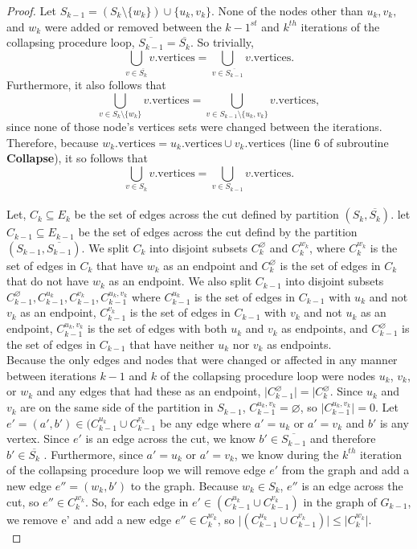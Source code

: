 \documentclass[psamsfonts, 10pt]{amsart}
\theoremstyle{definition}
\theoremstyle{remark}
\numberwithin{equation}{section}
\newcommand{\tor}{\text{ or } }
\newcommand{\creturn}{\mbox{}\\}
\begin{document}
\begin{proof}
Let $S_{k-1} = (S_k \setminus \{w_k\}) \cup \{u_k, v_k\}$. None of the nodes other than $u_k,v_k,$ and $w_k$ were added or removed between the $k-1^{st}$ and $k^{th}$ iterations of the collapsing procedure loop, $\overline{S_{k-1}} = \overline{S_k}$. So trivially, 
\[
\bigcup_{v \in \overline{S_k}} v.\text{vertices} = \bigcup_{v \in \overline{S_{k-1}}} v.\text{vertices}.
\]
Furthermore, it also follows that
\[
\bigcup_{v \in S_k \setminus \{w_k\}} v.\text{vertices} = \bigcup_{v \in S_{k-1} \setminus \{u_k, v_k\}} v.\text{vertices},
\]
since none of those node's vertices sets were changed between the iterations. Therefore, because $w_k.\text{vertices} = u_k.\text{vertices} \cup v_k.\text{vertices}$ (line 6 of subroutine {\bf Collapse}), it so follows that
\[
\bigcup_{v \in S_k} v.\text{vertices} = \bigcup_{v \in S_{k-1}} v.\text{vertices}.
\]
\creturn
Let, $C_k \subseteq E_k$ be the set of edges across the cut defined by partition $(S_k, \overline{S_k})$. let $C_{k-1} \subseteq E_{k-1}$ be the set of edges across the cut defind by the partition $(S_{k-1}, \overline{S_{k-1}})$. We split $C_{k}$ into disjoint subsets $C_{k}^\varnothing$ and $C_k^{w_k}$, where $C_k^{w_k}$ is the set of edges in $C_k$ that have $w_k$ as an endpoint and $C_k^{
\varnothing}$ is the set of edges in $C_k$ that do not have $w_k$ as an endpoint. We also split $C_{k-1}$ into disjoint subsets $C_{k-1}^\varnothing, C_{k-1}^{u_k}, C_{k-1}^{v_k}, C_{k-1}^{u_k,v_k}$ where $C_{k-1}^{u_k}$ is the set of edges in $C_{k-1}$ with $u_k$ and not $v_k$ as an endpoint, $C_{k-1}^{v_k}$ is the set of edges in $C_{k-1}$ with $v_k$ and not $u_k$ as an endpoint,  $C_{k-1}^{u_k,v_k}$ is the set of edges with both $u_k$ and $v_k$ as endpoints, and $C_{k-1}^\varnothing$ is the set of edges in $C_{k-1}$ that have neither $u_k$ nor $v_k$ as endpoints.
\\

Because the only edges and nodes that were changed or affected in any manner between iterations $k-1$ and $k$ of the collapsing procedure loop were nodes $u_k$, $v_k$, or $w_k$ and any edges that had these as an endpoint, $\lvert C_{k-1}^\varnothing \rvert = \lvert C_k^\varnothing$. Since $u_k$ and $v_k$ are on the same side of the partition in $S_{k-1}$, $C_{k-1}^{u_k,v_k} = \varnothing$, so $\lvert C_{k-1}^{u_k,v_k}  \rvert = 0$. Let $e' = (a', b') \in (C_{k-1}^{u_k} \cup C_{k-1}^{v_k}$ be any edge where $a' = u_k \tor a' = v_k$ and $b'$ is any vertex. Since $e'$ is an edge across the cut, we know $b' \in \overline{S_{k-1}}$ and therefore $b' \in \overline{S_{k}}$ . Furthermore, since $a' = u_k \tor a' = v_k$, we know during the $k^{th}$ iteration of the collapsing procedure loop we will remove edge $e'$ from the graph and add a new edge $e'' = (w_k, b')$ to the graph. Because $w_k \in S_{k}$, $e''$ is an edge across the cut, so $e'' \in C_{k}^{w_k}$. So, for each edge in $e' \in (C_{k-1}^{u_k} \cup C_{k-1}^{v_k})$ in the graph of $G_{k-1}$, we remove e' and add a new edge $e'' \in C_{k}^{w_k}$, so $\lvert (C_{k-1}^{u_k} \cup C_{k-1}^{v_k}) \rvert \leq \lvert C_{k}^{w_k} \rvert$.\\


\end{proof}
\end{document}
